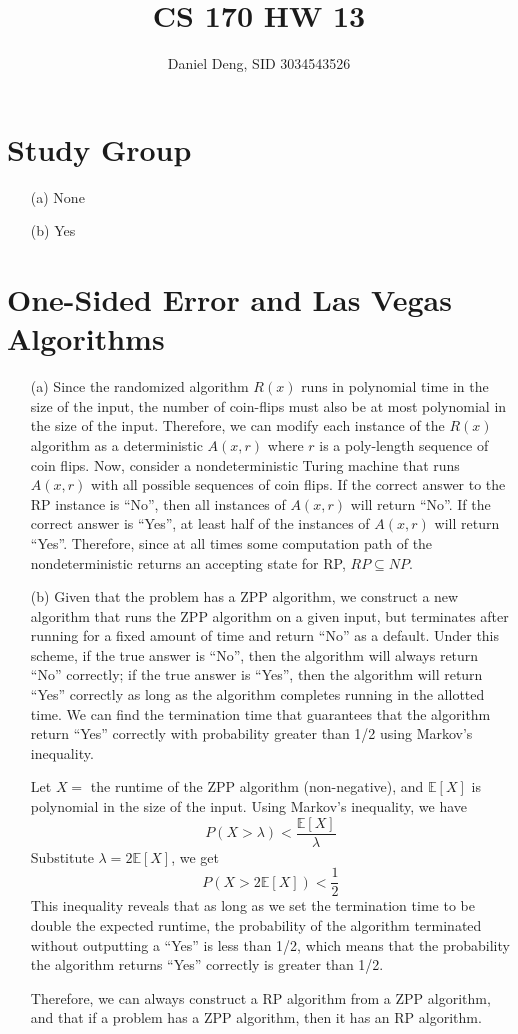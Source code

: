 \documentclass[11pt]{article}
\title{CS 170 HW 13}
\author{Daniel Deng, SID 3034543526}
\date{}
\theoremstyle{definition}
\theoremstyle{remark}
\begin{document}
\maketitle

\section{Study Group}
\begin{enumerate}
\item[(a)] None
\item[(b)] Yes
\end{enumerate}
\clearpage

\section{One-Sided Error and Las Vegas Algorithms}
\begin{enumerate}
\item[(a)]
Since the randomized algorithm $R(x)$ runs in polynomial time in the size of the input, the number of coin-flips must also be at most polynomial in the size of the input. Therefore, we can modify each instance of the $R(x)$ algorithm as a deterministic $A(x,r)$ where $r$ is a poly-length sequence of coin flips. Now, consider a nondeterministic Turing machine that runs $A(x,r)$ with all possible sequences of coin flips. If the correct answer to the RP instance is ``No'', then all instances of $A(x,r)$ will return ``No''. If the correct answer is ``Yes'', at least half of the instances of $A(x,r)$ will return ``Yes''. Therefore, since at all times some computation path of the nondeterministic returns an accepting state for RP, $RP \subseteq NP$.

\item[(b)]
Given that the problem has a ZPP algorithm, we construct a new algorithm that runs the ZPP algorithm on a given input, but terminates after running for a fixed amount of time and return ``No'' as a default. Under this scheme, if the true answer is ``No'', then the algorithm will always return ``No'' correctly; if the true answer is ``Yes'', then the algorithm will return ``Yes'' correctly as long as the algorithm completes running in the allotted time. We can find the termination time that guarantees that the algorithm return ``Yes'' correctly with probability greater than 1/2 using Markov's inequality. 

Let $X = $ the runtime of the ZPP algorithm (non-negative), and $\mathbb{E}[X]$ is polynomial in the size of the input. Using Markov's inequality, we have
\[
P(X>\lambda) < \frac{\mathbb{E}[X]}{\lambda}
\]
Substitute $\lambda = 2\mathbb{E}[X]$, we get
\[
P(X > 2\mathbb{E}[X]) < \frac{1}{2}
\]
This inequality reveals that as long as we set the termination time to be double the expected runtime, the probability of the algorithm terminated without outputting a ``Yes'' is less than 1/2, which means that the probability the algorithm returns ``Yes'' correctly is greater than 1/2.

Therefore, we can always construct a RP algorithm from a ZPP algorithm, and that if a problem has a ZPP algorithm, then it has an RP algorithm.
\end{enumerate}
\clearpage
\end{document}
